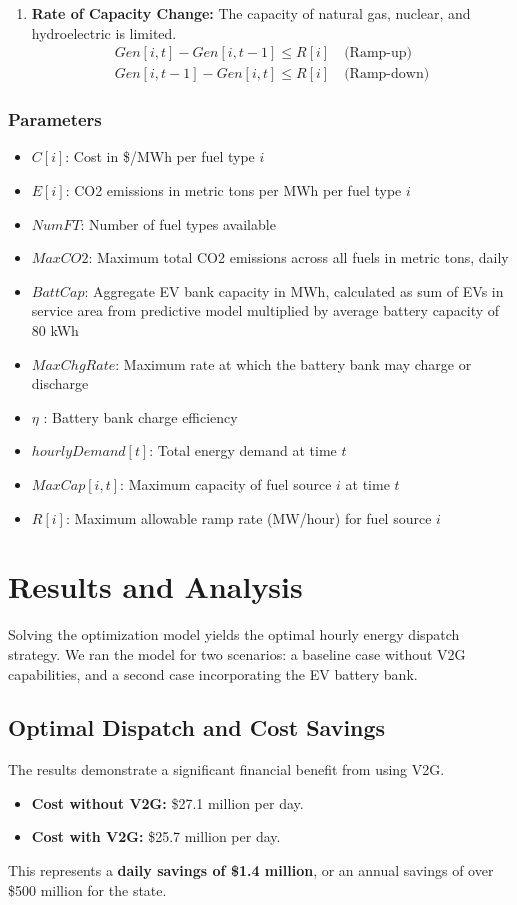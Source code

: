 \documentclass[12pt, letterpaper]{article}
\begin{document}
\begin{enumerate}
    \item \textbf{Rate of Capacity Change:} The capacity of natural gas, nuclear, and hydroelectric is limited.
    \begin{gather}
    Gen[i, t] - Gen[i,t-1] \leq R[i] \quad \text{(Ramp-up)} \\
    Gen[i,t-1] - Gen[i,t] \leq R[i] \quad \text{(Ramp-down)}
    \end{gather}
    
\end{enumerate}

\subsubsection{Parameters}
\begin{itemize}
    \item $C[i]$: Cost in \$/MWh per fuel type $i$
    \item $E[i]$: CO2 emissions in metric tons per MWh per fuel type $i$
    \item $NumFT$: Number of fuel types available
    \item $MaxCO2$: Maximum total CO2 emissions across all fuels in metric tons, daily
    \item $BattCap$: Aggregate EV bank capacity in MWh, calculated as sum of EVs in service area from predictive model multiplied by average battery capacity of 80 kWh
    \item $MaxChgRate$: Maximum rate at which the battery bank may charge or discharge
    \item $\eta$ : Battery bank charge efficiency
    \item $hourlyDemand[t]$: Total energy demand at time $t$
    \item $MaxCap[i,t]$: Maximum capacity of fuel source $i$ at time $t$
    \item $R[i]$: Maximum allowable ramp rate (MW/hour) for fuel source $i$
\end{itemize}

\section{Results and Analysis}

Solving the optimization model yields the optimal hourly energy dispatch strategy. We ran the model for two scenarios: a baseline case without V2G capabilities, and a second case incorporating the EV battery bank.

\subsection{Optimal Dispatch and Cost Savings}
The results demonstrate a significant financial benefit from using V2G.
\begin{itemize}
    \item \textbf{Cost without V2G:} \$27.1 million per day.
    \item \textbf{Cost with V2G:} \$25.7 million per day.
\end{itemize}
This represents a \textbf{daily savings of \$1.4 million}, or an annual savings of over \$500 million for the state.
\end{document}
